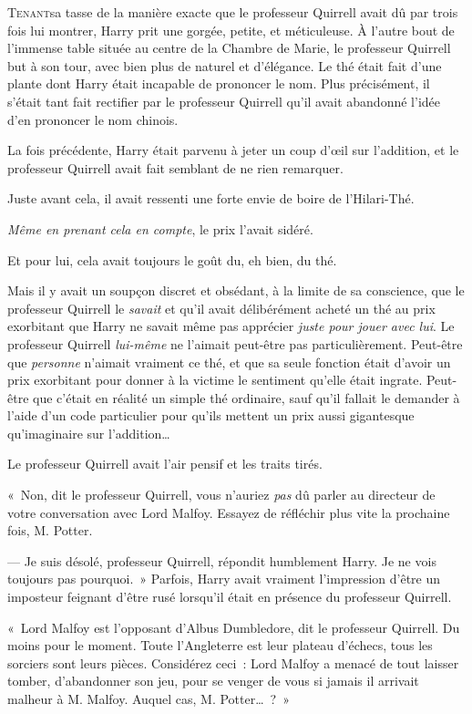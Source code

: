 
\lettrine{T}{enant}sa tasse de la manière exacte que le professeur Quirrell avait dû par trois fois lui montrer, Harry prit une gorgée, petite, et méticuleuse. À l'autre bout de l'immense table située au centre de la Chambre de Marie, le professeur Quirrell but à son tour, avec bien plus de naturel et d'élégance. Le thé était fait d'une plante dont Harry était incapable de prononcer le nom. Plus précisément, il s'était tant fait rectifier par le professeur Quirrell qu'il avait abandonné l'idée d'en prononcer le nom chinois.

La fois précédente, Harry était parvenu à jeter un coup d'œil sur l'addition, et le professeur Quirrell avait fait semblant de ne rien remarquer.

Juste avant cela, il avait ressenti une forte envie de boire de l'Hilari-Thé.

\emph{Même en prenant cela en compte}, le prix l'avait sidéré.

Et pour lui, cela avait toujours le goût du, eh bien, du thé.

Mais il y avait un soupçon discret et obsédant, à la limite de sa conscience, que le professeur Quirrell le \emph{savait} et qu'il avait délibérément acheté un thé au prix exorbitant que Harry ne savait même pas apprécier \emph{juste pour jouer avec lui}. Le professeur Quirrell \emph{lui-même} ne l'aimait peut-être pas particulièrement. Peut-être que \emph{personne} n'aimait vraiment ce thé, et que sa seule fonction était d'avoir un prix exorbitant pour donner à la victime le sentiment qu'elle était ingrate. Peut-être que c'était en réalité un simple thé ordinaire, sauf qu'il fallait le demander à l'aide d'un code particulier pour qu'ils mettent un prix aussi gigantesque qu'imaginaire sur l'addition…

Le professeur Quirrell avait l'air pensif et les traits tirés.

«~Non, dit le professeur Quirrell, vous n'auriez \emph{pas} dû parler au directeur de votre conversation avec Lord Malfoy. Essayez de réfléchir plus vite la prochaine fois, M. Potter.

--- Je suis désolé, professeur Quirrell, répondit humblement Harry. Je ne vois toujours pas pourquoi.~» Parfois, Harry avait vraiment l'impression d'être un imposteur feignant d'être rusé lorsqu'il était en présence du professeur Quirrell.

«~Lord Malfoy est l'opposant d'Albus Dumbledore, dit le professeur Quirrell. Du moins pour le moment. Toute l'Angleterre est leur plateau d'échecs, tous les sorciers sont leurs pièces. Considérez ceci~: Lord Malfoy a menacé de tout laisser tomber, d'abandonner son jeu, pour se venger de vous si jamais il arrivait malheur à M. Malfoy. Auquel cas, M. Potter…~?~»

